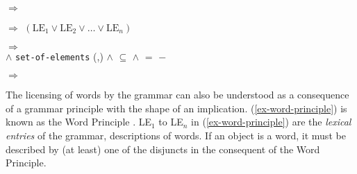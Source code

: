 \documentclass[output=paper
 	        ,biblatex
                ,babelshorthands
                ,newtxmath
                ,draftmode
                ,colorlinks, citecolor=brown
]{langscibook}
\begin{document}
{\begin{exe}
  \ex\label{ex-more-avms}
  \begin{xlist}
    \ex\label{ex-hfp}
    $\Rightarrow$
    
    \ex\label{ex-word-principle}
     $\Rightarrow$ $\left(\mbox{LE$_1$} \vee \mbox{LE$_2$} \vee \ldots  \vee \mbox{LE$_n$} \right)$
    
\ex\label{ex-semantics}
 $\Rightarrow$  \\
\hspace*{1.1cm}	$\wedge$ \texttt{set-of-elements} (,)
			$\wedge$  $\subseteq$ 
$\wedge$  $=$  $-$ 

\ex\label{ex-complex-ante}
$\Rightarrow$

  \end{xlist}
\end{exe}

The licensing of words by the grammar can also be
understood as a consequence of a grammar principle with the
shape of an implication. (\ref{ex-word-principle}) is known as the
Word Principle \citep*[500]{HoehleSpurenloseExtraktion}. LE$_{1}$ to LE$_{n}$
in (\ref{ex-word-principle}) are the
\emph{lexical entries} of the grammar, descriptions of words.  If an
object is a word, it must be described by (at least) one of the
disjuncts in the consequent of the Word Principle.

}
\end{document}
